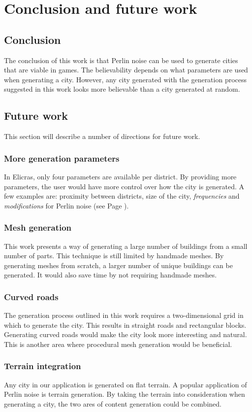 \section{Conclusion and future work}
	\subsection{Conclusion}
	The conclusion of this work is that Perlin noise can be used to generate cities that are viable in games. The believability depends on what parameters are used when generating a city. However, any city generated with the generation process suggested in this work looks more believable than a city generated at random.
	
	\subsection{Future work}
	This section will describe a number of directions for future work.
	
		\subsubsection{More generation parameters}
		In Elicras, only four parameters are available per district. By providing more parameters, the user would have more control over how the city is generated. A few examples are: proximity between districts, size of the city, \textit{frequencies} and \textit{modifications} for Perlin noise (see Page \pageref{fig:normal-and-modified-perlin}).
	
		\subsubsection{Mesh generation}
		This work presents a way of generating a large number of buildings from a small number of parts. This technique is still limited by handmade meshes. By generating meshes from scratch, a larger number of unique buildings can be generated. It would also save time by not requiring handmade meshes.
		
		\subsubsection{Curved roads}
		The generation process outlined in this work requires a two-dimensional grid in which to generate the city. This results in straight roads and rectangular blocks. Generating curved roads would make the city look more interesting and natural. This is another area where procedural mesh generation would be beneficial.
		
		\subsubsection{Terrain integration}
		Any city in our application is generated on flat terrain. A popular application of Perlin noise is terrain generation. By taking the terrain into consideration when generating a city, the two ares of content generation could be combined.